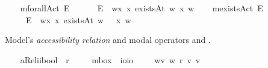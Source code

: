 \begin{isabellebody}
\isanewline
\ \ \isamarkupfalse%
\ mforallAct{\isacharcolon}{\isacharcolon}{\isachardoublequoteopen}{\isasymup}{\isasymlangle}{\isasymup}{\isasymlangle}{\isasymzero}{\isasymrangle}{\isasymrangle}{\isachardoublequoteclose}\ {\isacharparenleft}{\isachardoublequoteopen}\isactrlbold {\isasymforall}\isactrlsup E{\isachardoublequoteclose}{\isacharparenright}\ %
\isanewline
\ \ \ \ \ {\isachardoublequoteopen}\isactrlbold {\isasymforall}\isactrlsup E{\isasymPhi}\ {\isasymequiv}\ {\isasymlambda}w{\isachardot}{\isasymforall}x{\isachardot}\ {\isacharparenleft}x\ existsAt\ w{\isacharparenright}{\isasymlongrightarrow}{\isacharparenleft}{\isasymPhi}\ x\ w{\isacharparenright}{\isachardoublequoteclose}\isanewline
\ \ \isamarkupfalse%
\ mexistsAct{\isacharcolon}{\isacharcolon}{\isachardoublequoteopen}{\isasymup}{\isasymlangle}{\isasymup}{\isasymlangle}{\isasymzero}{\isasymrangle}{\isasymrangle}{\isachardoublequoteclose}\ {\isacharparenleft}{\isachardoublequoteopen}\isactrlbold {\isasymexists}\isactrlsup E{\isachardoublequoteclose}{\isacharparenright}\isanewline
\ \ \ \ \ {\isachardoublequoteopen}\isactrlbold {\isasymexists}\isactrlsup E{\isasymPhi}\ {\isasymequiv}\ {\isasymlambda}w{\isachardot}{\isasymexists}x{\isachardot}\ {\isacharparenleft}x\ existsAt\ w{\isacharparenright}\ {\isasymand}\ {\isacharparenleft}{\isasymPhi}\ x\ w{\isacharparenright}{\isachardoublequoteclose}%
\begin{isamarkuptext}%
Model's \emph{accessibility relation} and modal operators \isa{{\isasymbox}} and \isa{{\isasymdiamond}}.%
\end{isamarkuptext}\isamarkuptrue%
\ \ \isamarkupfalse%
\ aRel{\isacharcolon}{\isacharcolon}{\isachardoublequoteopen}i{\isasymRightarrow}i{\isasymRightarrow}bool{\isachardoublequoteclose}\ {\isacharparenleft}\ {\isachardoublequoteopen}r{\isachardoublequoteclose}\ {}{}{\isacharparenright}\isanewline
\ \ \isamarkupfalse%
\ mbox\ {\isacharcolon}{\isacharcolon}\ {\isachardoublequoteopen}io{\isasymRightarrow}io{\isachardoublequoteclose}\ {\isacharparenleft}{\isachardoublequoteopen}\ \ {\isachardoublequoteopen}\isactrlbold {\isasymbox}{\isasymphi}\ {\isasymequiv}\ {\isasymlambda}w{\isachardot}{\isasymforall}v{\isachardot}\ {\isacharparenleft}w\ r\ v{\isacharparenright}{\isasymlongrightarrow}{\isacharparenleft}{\isasymphi}\ v{\isacharparenright}{\isachardoublequoteclose}\isanewline

\end{isabellebody}
